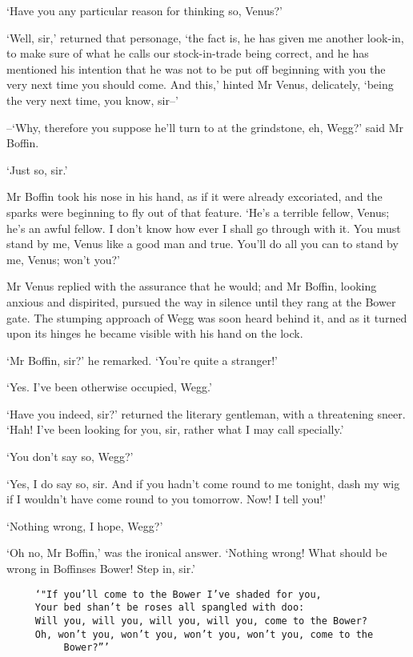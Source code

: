 ‘Have you any particular reason for thinking so, Venus?’

‘Well, sir,’ returned that personage, ‘the fact is, he has given me
another look-in, to make sure of what he calls our stock-in-trade being
correct, and he has mentioned his intention that he was not to be put
off beginning with you the very next time you should come. And this,’
hinted Mr Venus, delicately, ‘being the very next time, you know, sir--’

--‘Why, therefore you suppose he’ll turn to at the grindstone, eh,
Wegg?’ said Mr Boffin.

‘Just so, sir.’

Mr Boffin took his nose in his hand, as if it were already excoriated,
and the sparks were beginning to fly out of that feature. ‘He’s a
terrible fellow, Venus; he’s an awful fellow. I don’t know how ever I
shall go through with it. You must stand by me, Venus like a good man
and true. You’ll do all you can to stand by me, Venus; won’t you?’

Mr Venus replied with the assurance that he would; and Mr Boffin,
looking anxious and dispirited, pursued the way in silence until they
rang at the Bower gate. The stumping approach of Wegg was soon heard
behind it, and as it turned upon its hinges he became visible with his
hand on the lock.

‘Mr Boffin, sir?’ he remarked. ‘You’re quite a stranger!’

‘Yes. I’ve been otherwise occupied, Wegg.’

‘Have you indeed, sir?’ returned the literary gentleman, with a
threatening sneer. ‘Hah! I’ve been looking for you, sir, rather what I
may call specially.’

‘You don’t say so, Wegg?’

‘Yes, I do say so, sir. And if you hadn’t come round to me tonight, dash
my wig if I wouldn’t have come round to you tomorrow. Now! I tell you!’

‘Nothing wrong, I hope, Wegg?’

‘Oh no, Mr Boffin,’ was the ironical answer. ‘Nothing wrong! What should
be wrong in Boffinses Bower! Step in, sir.’

\begin{verbatim}
     ‘"If you’ll come to the Bower I’ve shaded for you,
     Your bed shan’t be roses all spangled with doo:
     Will you, will you, will you, will you, come to the Bower?
     Oh, won’t you, won’t you, won’t you, won’t you, come to the
          Bower?”’
\end{verbatim}

